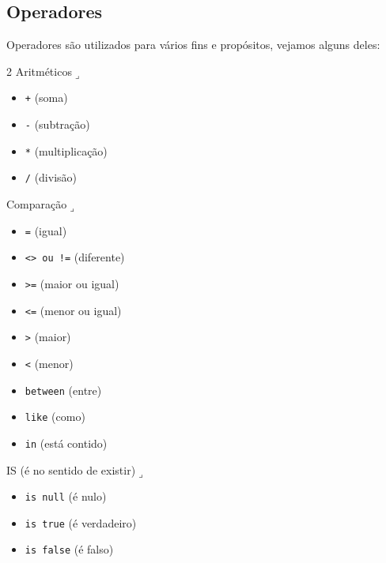 \documentclass[a4paper]{article}
\begin{document}
        \subsection{Operadores}
        
        Operadores são utilizados para vários fins e propósitos, vejamos alguns deles:
        
        \bigskip
        
        \begin{multicols}{2}
            Aritméticos\(\lrcorner\)
            
            \begin{itemize}
                \item \texttt{+} (soma)
                \item \texttt{-} (subtração)
                \item \texttt{*} (multiplicação)
                \item \texttt{/} (divisão)
            \end{itemize}
            
            \medskip
            
            Comparação\(\lrcorner\)
            
            \begin{itemize}
                \item \texttt{=} (igual)
                \item \texttt{<> ou !=} (diferente)
                \item \texttt{>=} (maior ou igual)
                \item \texttt{<=} (menor ou igual)
                \item \texttt{>} (maior)
                \item \texttt{<} (menor)
                \item \texttt{between} (entre)
                \item \texttt{like} (como)
                \item \texttt{in} (está contido)
            \end{itemize}
            
            \medskip
            
            IS (é no sentido de existir)\(\lrcorner\)
            
            \begin{itemize}
                \item \texttt{is null} (é nulo)
                \item \texttt{is true} (é verdadeiro)
                \item \texttt{is false} (é falso)
            \end{itemize}
            

\end{multicols}
\end{document}
